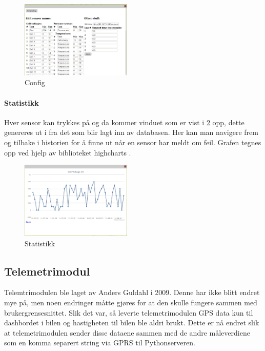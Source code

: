 \begin{figure}[H]
\includegraphics[width=200px]{images/config.png}
\caption{Config}
\label{fig:config}
\end{figure}

\paragraph{Statistikk}
Hver sensor kan trykkes på og da kommer vinduet som er vist i \ref{fig:stats} opp, dette genereres ut i fra det som blir lagt inn av databasen. Her kan man navigere frem og tilbake i historien for å finne ut når en sensor har meldt om feil. Grafen tegnes opp ved hjelp av biblioteket highcharts \cite{highcharts}.

\begin{figure}[H]
\includegraphics[width=200px]{images/stat.png}
\caption{Statistikk}
\label{fig:stats}
\end{figure}

\subsection{Telemetrimodul}
Telemtrimodulen ble laget av Anders Guldahl \cite{telemetrithesis} i 2009. Denne har ikke blitt endret mye på, men noen endringer måtte gjøres for at den skulle fungere sammen med brukergrensesnittet.
Slik det var, så leverte telemetrimodulen GPS data kun til dashbordet i bilen og hastigheten til bilen ble aldri brukt. Dette er nå endret slik at telemetrimodulen sender disse dataene sammen med de andre måleverdiene som en komma separert string via GPRS til Pythonserveren.
